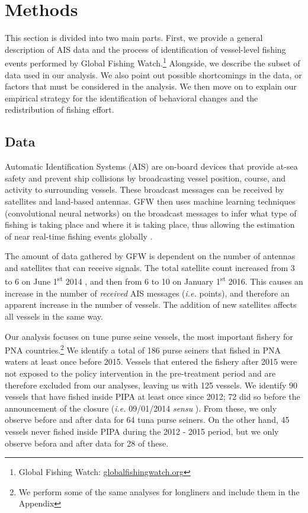 \documentclass[9pttwoside,lineno]{pnas-new}
\begin{document}
\clearpage

\section{Methods}\label{methods}

This section is divided into two main parts. First, we provide a general
description of AIS data and the process of identification of
vessel-level fishing events performed by Global Fishing Watch.\footnote{Global Fishing Watch: \url{globalfishingwatch.org}}
Alongside, we describe
the subset of data used in our analysis. We also point
out possible shortcomings in the data, or factors that must be
considered in the analysis. We then move on to explain our
empirical strategy for the identification of behavioral changes and
the redistribution of fishing effort.

\subsection{Data}\label{data}

Automatic Identification Systems (AIS) are on-board devices that provide
at-sea safety and prevent ship collisions by broadcasting vessel
position, course, and activity to surrounding vessels. These broadcast
messages can be received by satellites and land-based antennas. GFW then uses 
machine learning techniques (convolutional neural networks) on the broadcast messages
to infer what type of fishing is taking place and where it is taking place, thus
allowing the estimation of near real-time fishing events globally \citep{kroodsma_2018}.

The amount of data gathered by GFW is dependent on the number of antennas and
satellites that can receive signals. The total satellite count increased from 3 to 6 on 
June 1\textsuperscript{st}
2014 , and then from 6 to 10 on January
1\textsuperscript{st} 2016. This causes an increase in the number of
\emph{received} AIS messages (\emph{i.e.} points), and therefore an
apparent increase in the number of vessels.
The addition of new satellites affects all vessels in the same way. 

Our analysis focuses on tune purse seine vessels, the most important fishery
for PNA
countries.\footnote{We perform some of the same analyses for longliners and include them in the Appendix}
We identify a total of 186 purse seiners that fished in PNA waters at
least once before 2015. Vessels that entered the fishery after 2015 were not
exposed to the policy intervention in the pre-treatment period and are
therefore excluded from our analyses, leaving us with 125 vessels.
We identify 90 vessels that have fished inside PIPA
at least once since 2012; 72 did so before the announcement
of the closure (\emph{i.e.} 09/01/2014 \emph{sensu} \citep{mcdermott_2018}).
From these, we only observe before and after data for 64 tuna purse seiners.
On the other hand, 45 vessels never fished inside PIPA during the 2012 - 2015 period, 
but we only observe befora and after data for 28 of these.
\end{document}

